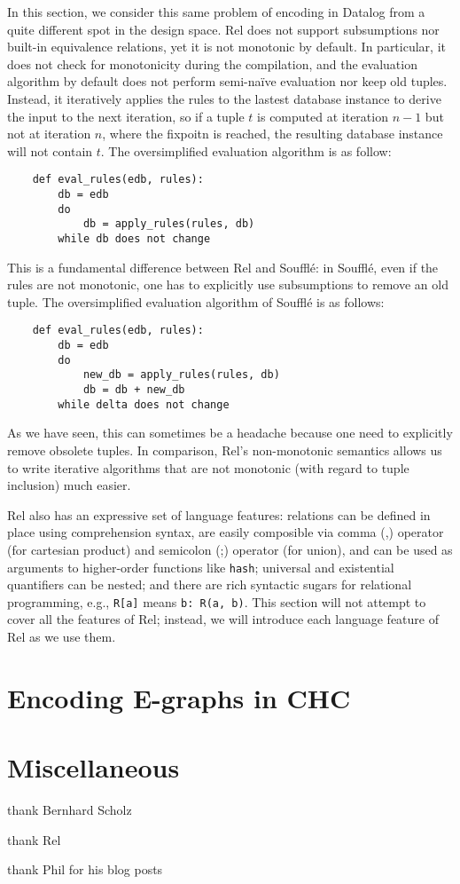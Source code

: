 In this section, we consider this same problem of encoding \egraphs in Datalog
 from a quite different spot in the design space.
Rel does not support subsumptions nor built-in equivalence relations,
 yet it is not monotonic by default.
In particular, it does not check for monotonicity during the compilation, 
 and the evaluation algorithm by default does not perform semi-na\"ive evaluation
 nor keep old tuples.
Instead, it iteratively applies the rules to the lastest database instance 
 to derive the input to the next iteration, 
 so if a tuple $t$ is computed at iteration $n-1$ but not at iteration $n$, 
 where the fixpoitn is reached, the resulting database instance will not contain $t$.
The oversimplified evaluation algorithm is as follow:
\begin{verbatim}
    def eval_rules(edb, rules):
        db = edb
        do
            db = apply_rules(rules, db)
        while db does not change
\end{verbatim}
This is a fundamental difference between Rel and Souffl\'e:
 in Souffl\'e, even if the rules are not monotonic,
 one has to explicitly use subsumptions to remove an old tuple.
The oversimplified evaluation algorithm of Souffl\'e is as follows:
\begin{verbatim}
    def eval_rules(edb, rules):
        db = edb
        do
            new_db = apply_rules(rules, db)
            db = db + new_db
        while delta does not change
\end{verbatim}
As we have seen, this can sometimes be a headache 
 because one need to explicitly remove obsolete tuples.
In comparison,
 Rel's non-monotonic semantics allows us to write iterative algorithms that are
 not monotonic (with regard to tuple inclusion) much easier.

Rel also has an expressive set of language features:
 relations can be defined in place using comprehension syntax,
 are easily composible via comma (,) operator (for cartesian product) 
 and semicolon (;) operator (for union),
 and can be used as arguments to higher-order functions like \verb|hash|;
 universal and existential quantifiers can be nested;
 and there are rich syntactic sugars for relational programming, e.g.,
 \verb|R[a]| means \verb|b: R(a, b)|.
This section will not attempt to cover all the features of Rel;
 instead, we will introduce each language feature of Rel as we use them.



\section{Encoding E-graphs in CHC}


\section{Miscellaneous}

thank Bernhard Scholz

thank Rel

thank Phil for his blog posts